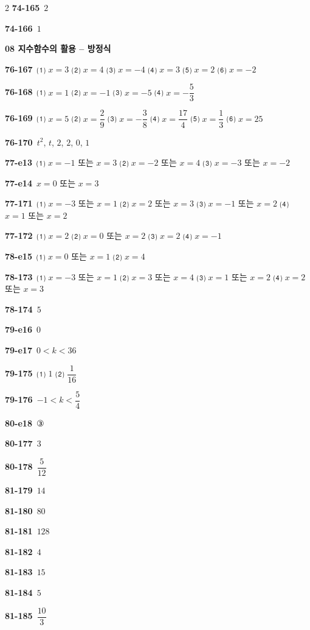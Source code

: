 \documentclass[10pt,a4paper]{article}
\begin{document}
\begin{multicols}{2}
\noindent\textbf{74-165}\ $2$\par
\noindent\textbf{74-166}\ $1$\par
\noindent\textbf{08 지수함수의 활용 – 방정식}\par\smallskip
\noindent\textbf{76-167}\ ⑴ $x=3$ ⑵ $x=4$ ⑶ $x=-4$ ⑷ $x=3$ ⑸ $x=2$ ⑹ $x=-2$\par
\noindent\textbf{76-168}\ ⑴ $x=1$ ⑵ $x=-1$ ⑶ $x=-5$ ⑷ $x=-\dfrac{5}{3}$\par
\noindent\textbf{76-169}\ ⑴ $x=5$ ⑵ $x=\dfrac{2}{9}$ ⑶ $x=-\dfrac{3}{8}$ ⑷ $x=\dfrac{17}{4}$ ⑸ $x=\dfrac{1}{3}$ ⑹ $x=25$\par
\noindent\textbf{76-170}\ $t^2$, $t$, $2$, $2$, $0$, $1$\par
\noindent\textbf{77-e13}\ ⑴ $x=-1$ 또는 $x=3$ ⑵ $x=-2$ 또는 $x=4$ ⑶ $x=-3$ 또는 $x=-2$\par
\noindent\textbf{77-e14}\ $x=0$ 또는 $x=3$\par
\noindent\textbf{77-171}\ ⑴ $x=-3$ 또는 $x=1$ ⑵ $x=2$ 또는 $x=3$ ⑶ $x=-1$ 또는 $x=2$ ⑷ $x=1$ 또는 $x=2$\par
\noindent\textbf{77-172}\ ⑴ $x=2$ ⑵ $x=0$ 또는 $x=2$ ⑶ $x=2$ ⑷ $x=-1$\par
\noindent\textbf{78-e15}\ ⑴ $x=0$ 또는 $x=1$ ⑵ $x=4$\par
\noindent\textbf{78-173}\ ⑴ $x=-3$ 또는 $x=1$ ⑵ $x=3$ 또는 $x=4$ ⑶ $x=1$ 또는 $x=2$ ⑷ $x=2$ 또는 $x=3$\par
\noindent\textbf{78-174}\ $5$\par
\noindent\textbf{79-e16}\ $0$\par
\noindent\textbf{79-e17}\ $0<k<36$\par
\noindent\textbf{79-175}\ ⑴ $1$ ⑵ $\dfrac{1}{16}$\par
\noindent\textbf{79-176}\ $-1<k<\dfrac{5}{4}$\par
\noindent\textbf{80-e18}\ ③\par
\noindent\textbf{80-177}\ $3$\par
\noindent\textbf{80-178}\ $\dfrac{5}{12}$\par
\noindent\textbf{81-179}\ $14$\par
\noindent\textbf{81-180}\ $80$\par
\noindent\textbf{81-181}\ $128$\par
\noindent\textbf{81-182}\ $4$\par
\noindent\textbf{81-183}\ $15$\par
\noindent\textbf{81-184}\ $5$\par
\noindent\textbf{81-185}\ $\dfrac{10}{3}$\par

\end{multicols}
\end{document}
